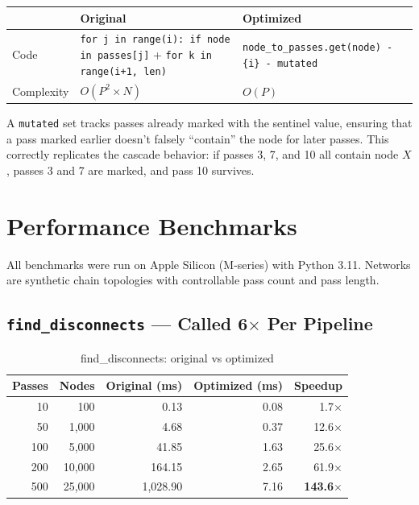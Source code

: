 \documentclass[11pt,a4paper]{article}
\begin{document}
\begin{table}[H]
\centering
\begin{tabularx}{\textwidth}{lXX}
\toprule
& \textbf{Original} & \textbf{Optimized} \\
\midrule
Code & \texttt{for j in range(i): if node in passes[j]} + \texttt{for k in range(i+1, len)} & \texttt{node\_to\_passes.get(node) - \{i\} - mutated} \\
Complexity & $O(P^2 \times N)$ & $O(P)$ \\
\bottomrule
\end{tabularx}
\end{table}

A \texttt{mutated} set tracks passes already marked with the sentinel value, ensuring that a pass marked earlier doesn't falsely ``contain'' the node for later passes. This correctly replicates the cascade behavior: if passes 3, 7, and 10 all contain node $X$, passes 3 and 7 are marked, and pass 10 survives.


\section{Performance Benchmarks}

All benchmarks were run on Apple Silicon (M-series) with Python 3.11. Networks are synthetic chain topologies with controllable pass count and pass length.

\subsection{\texttt{find\_disconnects} --- Called 6$\times$ Per Pipeline}

\begin{table}[H]
\centering
\caption{find\_disconnects: original vs optimized}
\begin{tabular}{rrrrr}
\toprule
\textbf{Passes} & \textbf{Nodes} & \textbf{Original (ms)} & \textbf{Optimized (ms)} & \textbf{Speedup} \\
\midrule
10 & 100 & 0.13 & 0.08 & 1.7$\times$ \\
50 & 1,000 & 4.68 & 0.37 & 12.6$\times$ \\
100 & 5,000 & 41.85 & 1.63 & 25.6$\times$ \\
200 & 10,000 & 164.15 & 2.65 & 61.9$\times$ \\
500 & 25,000 & 1,028.90 & 7.16 & \textbf{143.6$\times$} \\
\bottomrule
\end{tabular}
\end{table}
\end{document}
